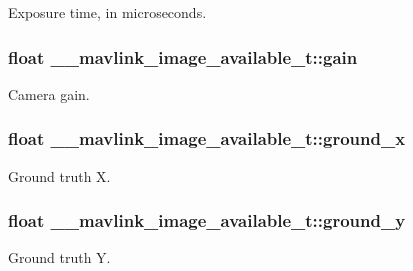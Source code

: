 Exposure time, in microseconds. 

\hypertarget{struct____mavlink__image__available__t_a8f7456ee295f1e11f912daabd9658ea5}{
\subsubsection[{gain}]{\setlength{\rightskip}{0pt plus 5cm}float \+\_\+\+\_\+mavlink\+\_\+image\+\_\+available\+\_\+t\+::gain}}\label{struct____mavlink__image__available__t_a8f7456ee295f1e11f912daabd9658ea5}


Camera gain. 

\hypertarget{struct____mavlink__image__available__t_acca01133ac2d009cdde67460cd6c3a80}{
\subsubsection[{ground\+\_\+x}]{\setlength{\rightskip}{0pt plus 5cm}float \+\_\+\+\_\+mavlink\+\_\+image\+\_\+available\+\_\+t\+::ground\+\_\+x}}\label{struct____mavlink__image__available__t_acca01133ac2d009cdde67460cd6c3a80}


Ground truth X. 

\hypertarget{struct____mavlink__image__available__t_a7af72af41728ab05afbfdce680b2897d}{
\subsubsection[{ground\+\_\+y}]{\setlength{\rightskip}{0pt plus 5cm}float \+\_\+\+\_\+mavlink\+\_\+image\+\_\+available\+\_\+t\+::ground\+\_\+y}}\label{struct____mavlink__image__available__t_a7af72af41728ab05afbfdce680b2897d}


Ground truth Y. 

